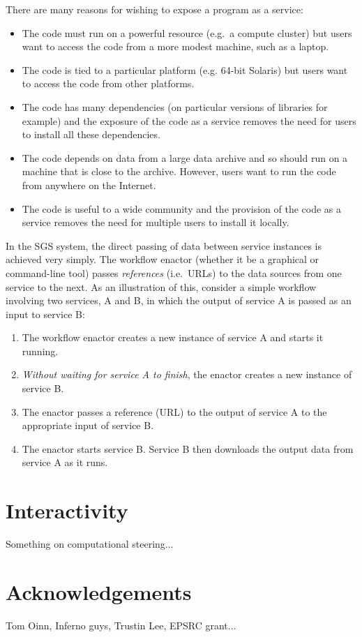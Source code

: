 \documentclass{llncs}
\begin{document}
There are many reasons for wishing to expose a program as a service:
\begin{itemize}
	\item The code must run on a powerful resource (e.g.\ a compute cluster) but users want to access the code from a more modest machine, such as a laptop.
	\item The code is tied to a particular platform (e.g. 64-bit Solaris) but users want to access the code from other platforms.
	\item The code has many dependencies (on particular versions of libraries for example) and the exposure of the code as a service removes the need for users to install all these dependencies.
	\item The code depends on data from a large data archive and so should run on a machine that is close to the archive.  However, users want to run the code from anywhere on the Internet.
	\item The code is useful to a wide community and the provision of the code as a service removes the need for multiple users to install it locally.
\end{itemize}

%
In the SGS system, the direct passing of data between service instances is achieved very simply.  The workflow enactor (whether it be a graphical or command-line tool) passes {\em references\/} (i.e.\ URLs) to the data sources from one service to the next.  As an illustration of this, consider a simple workflow involving two services, A and B, in which the output of service A is passed as an input to service B:
\begin{enumerate}
	\item The workflow enactor creates a new instance of service A and starts it running.
	\item {\em Without waiting for service A to finish\/}, the enactor creates a new instance of service B.
	\item The enactor passes a reference (URL) to the output of service A to the appropriate input of service B.
	\item The enactor starts service B.  Service B then downloads the output data from service A as it runs.
\end{enumerate}

%


\section{Interactivity} \label{sec:interactivity}
Something on computational steering...


\section*{Acknowledgements}
Tom Oinn, Inferno guys, Trustin Lee, EPSRC grant...
%
%


\end{document}
